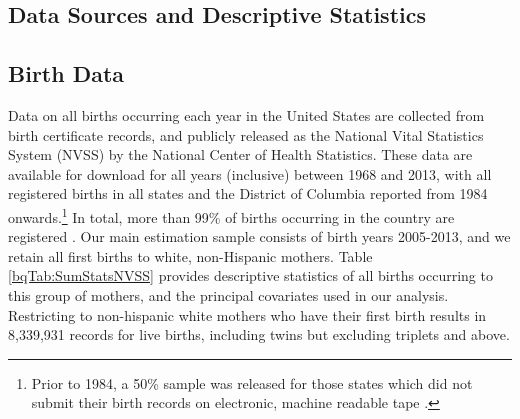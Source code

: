\documentclass[a4paper, 12 pt]{article}
\theoremstyle{plain}
\begin{document}
\begin{doublespace}
\section{Data Sources and Descriptive Statistics}
\label{scn:data}
\subsection{Birth Data}
\label{bqSscn:USAdata}
Data on all births occurring each year in the United States are collected from birth certificate records, and publicly released as the National Vital Statistics System (NVSS) by the National Center of Health Statistics. These data are available for download for all years (inclusive) between 1968 and 2013, with all registered births in all states and the District of Columbia reported from 1984 onwards.\footnote{Prior to 1984, a 50\% sample was released for those states which did not submit their birth records on electronic, machine readable tape \citep{Martinetal2015}.}  In total, more than 99\% of births occurring in the country are registered \citep{Martinetal2015}. Our main estimation sample consists of birth years 2005-2013, and we retain all first births to white, non-Hispanic mothers.  Table \ref{bqTab:SumStatsNVSS} provides descriptive statistics of all births occurring to this group of mothers, and the principal covariates used in our analysis.  Restricting to non-hispanic white mothers who have their first birth results in 8,339,931 records for live births, including twins but excluding triplets and above. %


\end{doublespace}
\end{document}

